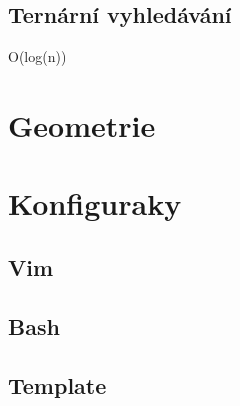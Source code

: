 \documentclass[10pt, a4paper]{article}
\begin{document}
\subsection{Ternární vyhledávání}
O(log(n))


\newpage

\section{Geometrie}


\newpage

\section{Konfiguraky}
\subsection{Vim}

\subsection{Bash}

\subsection{Template}

\end{document}
